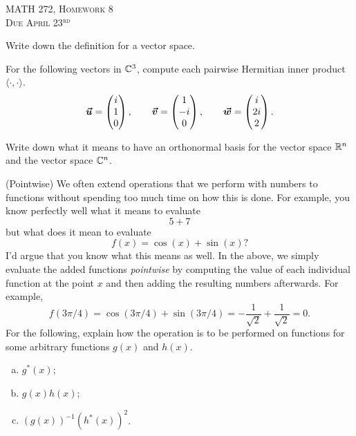 \documentclass[12pt]{article} %
\newcommand{\innprod}[2]{\langle #1, #2\rangle}
\begin{document}
\begin{center}
   \textsc{\large MATH 272, Homework 8}\\
   \textsc{Due April 23$^\textrm{rd}$}
\end{center}
\vspace{.5cm}

\begin{problem}
	Write down the definition for a vector space.  
\end{problem}

\begin{problem}
	For the following vectors in $\mathbb{C}^3$, compute each pairwise Hermitian inner product $\innprod{\cdot}{\cdot}$.  
	\[
		\boldsymbol{\vec{u}} = \begin{pmatrix} i \\ 1 \\ 0 \end{pmatrix}, \qquad \boldsymbol{\vec{v}} = \begin{pmatrix} 1 \\ -i \\ 0 \end{pmatrix}, \qquad \boldsymbol{\vec{w}} = \begin{pmatrix} i \\ 2i \\ 2 \end{pmatrix}.
	\]
\end{problem}

\begin{problem}
	Write down what it means to have an orthonormal basis for the vector space $\mathbb{R}^n$ and the vector space $\mathbb{C}^n$.
\end{problem}

\begin{problem}
	(Pointwise) We often extend operations that we perform with numbers to functions without spending too much time on how this is done. For example, you know perfectly well what it means to evaluate
	\[
		5+7
	\]
	but what does it mean to evaluate
	\[
		f(x)=\cos(x)+\sin(x)?
	\]
	I'd argue that you know what this means as well.  In the above, we simply evaluate the added functions \emph{pointwise} by computing the value of each individual function at the point $x$ and then adding the resulting numbers afterwards. For example,
	\[
		f(3\pi/4)=\cos(3\pi/4) + \sin(3\pi/4)= -\frac{1}{\sqrt{2}}+\frac{1}{\sqrt{2}}=0.
	\]
	For the following, explain how the operation is to be performed on functions for some arbitrary functions $g(x)$ and $h(x)$.
	\begin{enumerate}[(a)]
		\item $g^*(x)$;
		\item $g(x)h(x)$;
		\item $(g(x))^{-1}(h^*(x))^2$.
	\end{enumerate}
\end{problem}
\end{document}
